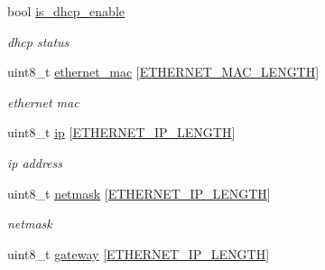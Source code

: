 \begin{DoxyCompactItemize}
\mbox{\label{structconfiguration__t_a04554256dd43582433092cd70dd8b87d}} 
bool \hyperlink{structconfiguration__t_a04554256dd43582433092cd70dd8b87d}{is\+\_\+dhcp\+\_\+enable}
\begin{DoxyCompactList}\small\item\em dhcp status \end{DoxyCompactList}\item 
\mbox{\label{structconfiguration__t_a6ade77826c87e62532cae8ca0f045dac}} 
uint8\+\_\+t \hyperlink{structconfiguration__t_a6ade77826c87e62532cae8ca0f045dac}{ethernet\+\_\+mac} \mbox{[}\hyperlink{ethernet__config_8h_aafad911924144dbfc03b66b146ed4439}{E\+T\+H\+E\+R\+N\+E\+T\+\_\+\+M\+A\+C\+\_\+\+L\+E\+N\+G\+TH}\mbox{]}
\begin{DoxyCompactList}\small\item\em ethernet mac \end{DoxyCompactList}\item 
\mbox{\label{structconfiguration__t_a0b698acfbb52f889c906b9b175f7a5d5}} 
uint8\+\_\+t \hyperlink{structconfiguration__t_a0b698acfbb52f889c906b9b175f7a5d5}{ip} \mbox{[}\hyperlink{ethernet__config_8h_ae8de53528e88d8ff4516d82a48590bd7}{E\+T\+H\+E\+R\+N\+E\+T\+\_\+\+I\+P\+\_\+\+L\+E\+N\+G\+TH}\mbox{]}
\begin{DoxyCompactList}\small\item\em ip address \end{DoxyCompactList}\item 
\mbox{\label{structconfiguration__t_a60716ed8c6a82119a46eb6345b88ca32}} 
uint8\+\_\+t \hyperlink{structconfiguration__t_a60716ed8c6a82119a46eb6345b88ca32}{netmask} \mbox{[}\hyperlink{ethernet__config_8h_ae8de53528e88d8ff4516d82a48590bd7}{E\+T\+H\+E\+R\+N\+E\+T\+\_\+\+I\+P\+\_\+\+L\+E\+N\+G\+TH}\mbox{]}
\begin{DoxyCompactList}\small\item\em netmask \end{DoxyCompactList}\item 
\mbox{\label{structconfiguration__t_a9d18b7f4094f4d7a50d2245e0370adc0}} 
uint8\+\_\+t \hyperlink{structconfiguration__t_a9d18b7f4094f4d7a50d2245e0370adc0}{gateway} \mbox{[}\hyperlink{ethernet__config_8h_ae8de53528e88d8ff4516d82a48590bd7}{E\+T\+H\+E\+R\+N\+E\+T\+\_\+\+I\+P\+\_\+\+L\+E\+N\+G\+TH}\mbox{]}

\end{DoxyCompactItemize}
